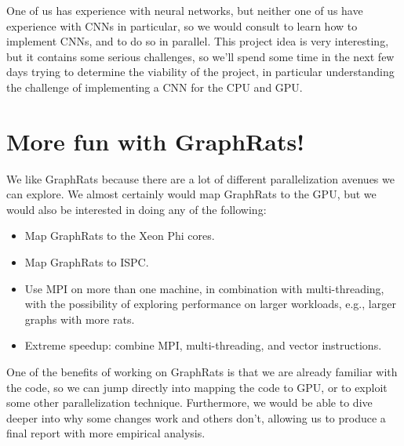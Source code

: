 \documentclass[11pt]{article} %
\begin{document}
One of us has experience with neural networks, but neither one of us have
experience with CNNs in particular, so we would consult \cite{DL,PDDL,DBLP,Dean}
to learn how to implement CNNs, and to do so in parallel. This project idea is
very interesting, but it contains some serious challenges, so we'll spend some
time in the next few days trying to determine the viability of the project, in
particular understanding the challenge of implementing a CNN for the CPU and
GPU.

\section*{More fun with GraphRats!}

We like GraphRats because there are a lot of different parallelization avenues
we can explore. We almost certainly would map GraphRats to the GPU, but we would
also be interested in doing any of the following:

\begin{itemize}
\item
Map GraphRats to the Xeon Phi cores.
\item
Map GraphRats to ISPC.
\item
Use MPI on more than one machine, in combination with multi-threading, with the
possibility of exploring performance on larger workloads, e.g., larger graphs
with more rats.
\item
Extreme speedup: combine MPI, multi-threading, and vector instructions.
\end{itemize}

One of the benefits of working on GraphRats is that we are already familiar with
the code, so we can jump directly into mapping the code to GPU, or to exploit
some other parallelization technique. Furthermore, we would be able to dive
deeper into why some changes work and others don't, allowing us to produce a
final report with more empirical analysis.

\printbibliography
\end{document}
